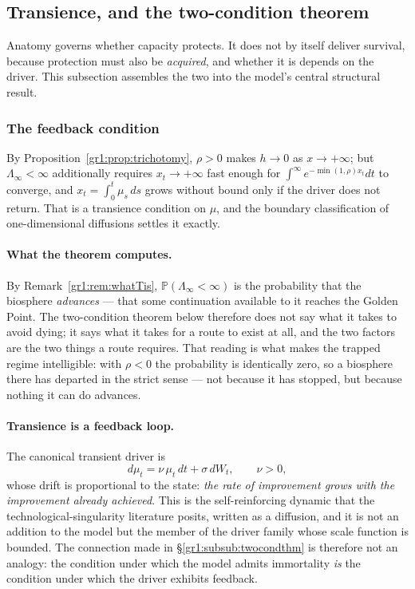 \documentclass[11pt]{article}
\numberwithin{equation}{section}
\theoremstyle{plain}
\theoremstyle{definition}
\theoremstyle{remark}
\newcommand{\PP}{\mathbb{P}}
\begin{document}
\subsection{Transience, and the two-condition theorem}
\label{gr1:sub:twocond}

Anatomy governs whether capacity protects. It does not by itself deliver
survival, because protection must also be \emph{acquired}, and whether
it is depends on the driver. This subsection assembles the two into the
model's central structural result.

\subsubsection{The feedback condition}\label{gr1:subsub:feedback}

By Proposition~\ref{gr1:prop:trichotomy}, $\rho>0$ makes $h\to0$ as
$x\to+\infty$; but $\Lambda_\infty<\infty$ additionally requires
$x_t\to+\infty$ fast enough for $\int^\infty e^{-\min(1,\rho)x_t}dt$ to
converge, and $x_t=\int_0^t\mu_s\,ds$ grows without bound only if the
driver does not return. That is a transience condition on $\mu$, and
the boundary classification of one-dimensional diffusions settles it
exactly.

\paragraph{What the theorem computes.}\label{gr1:rem:twocondreading}
By Remark~\ref{gr1:rem:whatTis}, $\PP(\Lambda_\infty<\infty)$ is the
probability that the biosphere \emph{advances} --- that some
continuation available to it reaches the Golden Point. The
two-condition theorem below therefore does not say what it takes to
avoid dying; it says what it takes for a route to exist at all, and the
two factors are the two things a route requires. That reading is what
makes the trapped regime intelligible: with $\rho<0$ the probability is
identically zero, so a biosphere there has departed in the strict
sense --- not because it has stopped, but because nothing it can do
advances.

\paragraph{Transience is a feedback loop.}\label{gr1:rem:feedback}
The canonical transient driver is
\begin{equation}\label{gr1:eq:uou}
d\mu_t=\nu\,\mu_t\,dt+\sigma\,dW_t,\qquad \nu>0,
\end{equation}
whose drift is proportional to the state: \emph{the rate of improvement
grows with the improvement already achieved}. This is the
self-reinforcing dynamic that the technological-singularity literature
posits, written as a diffusion, and it is not an addition to the model
but the member of the driver family whose scale function is bounded.
The connection made in \S\ref{gr1:subsub:twocondthm} is therefore not an
analogy: the condition under which the model admits immortality
\emph{is} the condition under which the driver exhibits feedback.
\end{document}
